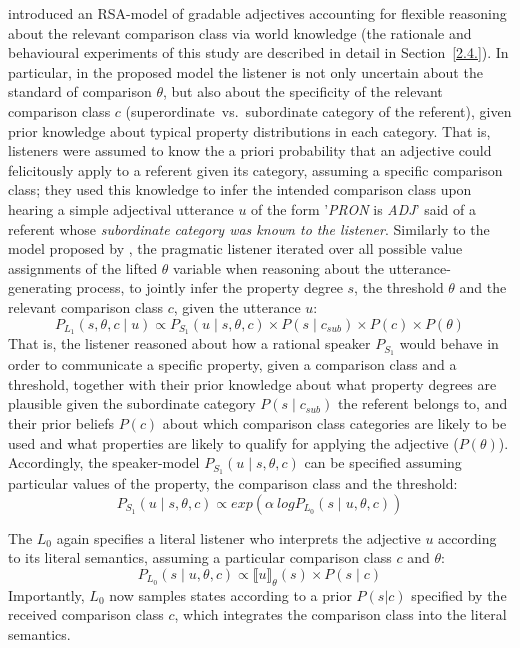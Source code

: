 \textcite{tessler2017warm} introduced an RSA-model of gradable adjectives accounting for flexible reasoning about the relevant comparison class via world knowledge (the rationale and behavioural experiments of this study are described in detail in Section~\ref{2.4.}). In particular, in the proposed model the listener is not only uncertain about the standard of comparison $\theta$, but also about the specificity of the relevant comparison class $c$ (superordinate~vs.~subordinate category of the referent), given prior knowledge about typical property distributions in each category. That is, listeners were assumed to know the a priori probability that an adjective could felicitously apply to a referent given its category, assuming a specific comparison class; they used this knowledge to infer the intended comparison class upon hearing a simple adjectival utterance $u$ of the form '\emph{PRON} is \emph{ADJ}' said of a referent whose \emph{subordinate category was known to the listener}.
Similarly to the model proposed by \textcite{lassiter2013context}, the pragmatic listener iterated over all possible value assignments of the lifted $\theta$ variable when reasoning about the utterance-generating process, to jointly infer the property degree $s$, the threshold $\theta$ and the relevant comparison class $c$, given the utterance $u$:
\begin{equation}
P_{L_1}(s, \theta, c \mid u) \propto P_{S_1} ( u \mid s, \theta, c) \times P(s \mid c_{sub}) \times P(c) \times P(\theta)
\end{equation} 
That is, the listener reasoned about how a rational speaker $P_{S_1}$ would behave in order to communicate a specific property, given a comparison class and a threshold, together with their prior knowledge about what property degrees are plausible given the subordinate category $P(s \mid c _{sub})$ the referent belongs to, and their prior beliefs $P(c)$ about which comparison class categories are likely to be used and what properties are likely to qualify for applying the adjective ($P(\theta)$). Accordingly, the speaker-model $P_{S_1}( u \mid s, \theta, c)$ can be specified assuming particular values of the property, the comparison class and the threshold:
\begin{equation}
P_{S_1}( u \mid s, \theta, c) \propto exp(\alpha \: log P_{L_0} (s \mid u, \theta, c))
\end{equation}

The $L_0$ again specifies a literal listener who interprets the adjective $u$ according to its literal semantics, assuming a particular comparison class $c$ and $\theta$:
\begin{equation}
P_{L_0}(s \mid u, \theta, c) \propto \llbracket u \rrbracket_{\theta} (s) \times P( s \mid c)
\end{equation}  
Importantly, $L_0$ now samples states according to a prior $P(s|c)$ specified by the received comparison class $c$, which integrates the comparison class into the literal semantics. 


